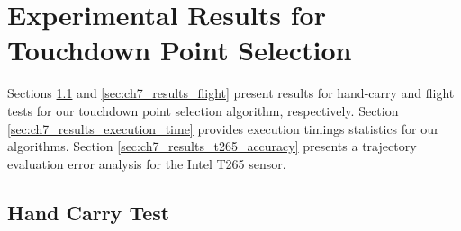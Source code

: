 \section{Experimental Results for Touchdown Point Selection}

Sections \ref{sec:ch7_results_handcarry} and \ref{sec:ch7_results_flight} present results for hand-carry and flight tests for our touchdown point selection algorithm, respectively. Section \ref{sec:ch7_results_execution_time} provides execution timings statistics for our algorithms.  Section \ref{sec:ch7_results_t265_accuracy} presents a trajectory evaluation error analysis for the Intel T265 sensor.

\subsection{Hand Carry Test} \label{sec:ch7_results_handcarry}
